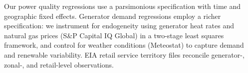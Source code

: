 \documentclass[sigconf,authordraft]{acmart}
\begin{document}
Our power quality regressions use a parsimonious specification with time and geographic fixed effects. Generator demand regressions employ a richer specification: we instrument for endogeneity using generator heat rates and natural gas prices (S\&P Capital IQ Global) in a two-stage least squares framework, and control for weather conditions (Meteostat) to capture demand and renewable variability. EIA retail service territory files reconcile generator-, zonal-, and retail-level observations.
\end{document}
